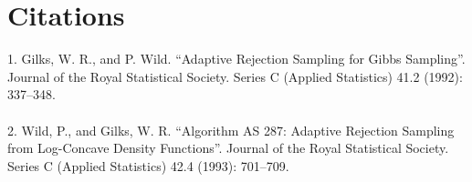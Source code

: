 \documentclass[12pt, oneside]{article}
\begin{document}
\section{Citations}
1. Gilks, W. R., and P. Wild. ``Adaptive Rejection Sampling for Gibbs Sampling''. Journal of the Royal Statistical Society. Series C (Applied Statistics) 41.2 (1992): 337--348.\\\\
2. Wild, P., and Gilks, W. R.  ``Algorithm AS 287: Adaptive Rejection Sampling from Log-Concave Density Functions''. Journal of the Royal Statistical Society. Series C (Applied Statistics) 42.4 (1993): 701--709.
\end{document}
